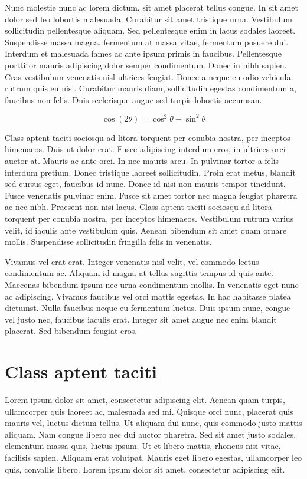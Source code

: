 \documentclass[rascunho,xindy]{fei}
\begin{document}
Nunc molestie nunc ac lorem dictum, sit amet placerat tellus congue. In sit amet dolor sed leo lobortis malesuada. Curabitur sit amet tristique urna. Vestibulum sollicitudin pellentesque aliquam. Sed pellentesque enim in lacus sodales laoreet. Suspendisse massa magna, fermentum at massa vitae, fermentum posuere dui. Interdum et malesuada fames ac ante ipsum primis in faucibus. Pellentesque porttitor mauris adipiscing dolor semper condimentum. Donec in nibh sapien. Cras vestibulum venenatis nisl ultrices feugiat. Donec a neque eu odio vehicula rutrum quis eu nisl. Curabitur mauris diam, sollicitudin egestas condimentum a, faucibus non felis. Duis scelerisque augue sed turpis lobortis accumsan.

\begin{equation}
\cos (2\theta) = \cos^2 \theta - \sin^2 \theta
\end{equation}

Class aptent taciti sociosqu ad litora torquent per conubia nostra, per inceptos himenaeos. Duis ut dolor erat. Fusce adipiscing interdum eros, in ultrices orci auctor at. Mauris ac ante orci. In nec mauris arcu. In pulvinar tortor a felis interdum pretium. Donec tristique laoreet sollicitudin. Proin erat metus, blandit sed cursus eget, faucibus id nunc. Donec id nisi non mauris tempor tincidunt. Fusce venenatis pulvinar enim. Fusce sit amet tortor nec magna feugiat pharetra ac nec nibh. Praesent non nisi lacus. Class aptent taciti sociosqu ad litora torquent per conubia nostra, per inceptos himenaeos. Vestibulum rutrum varius velit, id iaculis ante vestibulum quis. Aenean bibendum sit amet quam ornare mollis. Suspendisse sollicitudin fringilla felis in venenatis.

Vivamus vel erat erat. Integer venenatis nisl velit, vel commodo lectus condimentum ac. Aliquam id magna at tellus sagittis tempus id quis ante. Maecenas bibendum ipsum nec urna condimentum mollis. In venenatis eget nunc ac adipiscing. Vivamus faucibus vel orci mattis egestas. In hac habitasse platea dictumst. Nulla faucibus neque eu fermentum luctus. Duis ipsum nunc, congue vel justo nec, faucibus iaculis erat. Integer sit amet augue nec enim blandit placerat. Sed bibendum feugiat eros.

\section{Class aptent taciti}

Lorem ipsum dolor sit amet, consectetur adipiscing elit. Aenean quam turpis, ullamcorper quis laoreet ac, malesuada sed mi. Quisque orci nunc, placerat quis mauris vel, luctus dictum tellus. Ut aliquam dui nunc, quis commodo justo mattis aliquam. Nam congue libero nec dui auctor pharetra. Sed sit amet justo sodales, elementum massa quis, luctus ipsum. Ut et libero mattis, rhoncus nisi vitae, facilisis sapien. Aliquam erat volutpat. Mauris eget libero egestas, ullamcorper leo quis, convallis libero. Lorem ipsum dolor sit amet, consectetur adipiscing elit.
\end{document}

